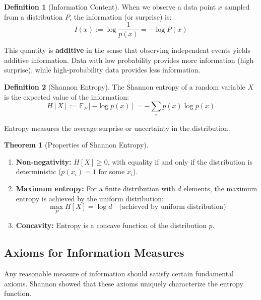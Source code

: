 \documentclass[12pt,a4paper]{article}
\theoremstyle{definition}
\newtheorem{definition}{Definition}[section]
\newtheorem{theorem}{Theorem}[section]
\begin{document}
\begin{definition}[Information Content]
When we observe a data point $x$ sampled from a distribution $P$, the information (or surprise) is:
\[
I(x) := \log \frac{1}{p(x)} = -\log P(x)
\]

This quantity is \textbf{additive} in the sense that observing independent events yields additive information. Data with low probability provides more information (high surprise), while high-probability data provides less information.
\end{definition}

\begin{definition}[Shannon Entropy]
The Shannon entropy of a random variable $X$ is the expected value of the information:
\[
H[X] := \mathbb{E}_P[-\log p(x)] = -\sum_{x} p(x) \log p(x)
\]

Entropy measures the average surprise or uncertainty in the distribution.
\end{definition}

\begin{theorem}[Properties of Shannon Entropy]
\begin{enumerate}
    \item \textbf{Non-negativity:} $H[X] \geq 0$, with equality if and only if the distribution is deterministic ($p(x_i) = 1$ for some $x_i$).
    
    \item \textbf{Maximum entropy:} For a finite distribution with $d$ elements, the maximum entropy is achieved by the uniform distribution:
    \[
    \max_P H[X] = \log d \quad \text{(achieved by uniform distribution)}
    \]
    
    \item \textbf{Concavity:} Entropy is a concave function of the distribution $p$.
\end{enumerate}
\end{theorem}

\subsection{Axioms for Information Measures}

Any reasonable measure of information should satisfy certain fundamental axioms. Shannon showed that these axioms uniquely characterize the entropy function.
\end{document}
